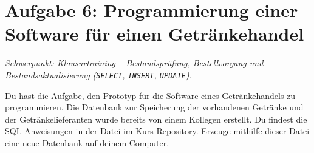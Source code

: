 \section{Aufgabe 6: Programmierung einer Software für einen Getränkehandel \tagLK}
\noindent \emph{Schwerpunkt: Klausurtraining -- Bestandsprüfung, Bestellvorgang und Bestandsaktualisierung (\texttt{SELECT}, \texttt{INSERT}, \texttt{UPDATE}).}

Du hast die Aufgabe, den Prototyp für die Software eines Getränkehandels zu
programmieren. Die Datenbank zur Speicherung der vorhandenen Getränke und der
Getränkelieferanten wurde bereits von einem Kollegen erstellt. Du findest die
SQL-Anweisungen in der Datei  im Kurs-Repository.
Erzeuge mithilfe dieser Datei eine neue Datenbank auf deinem Computer.

